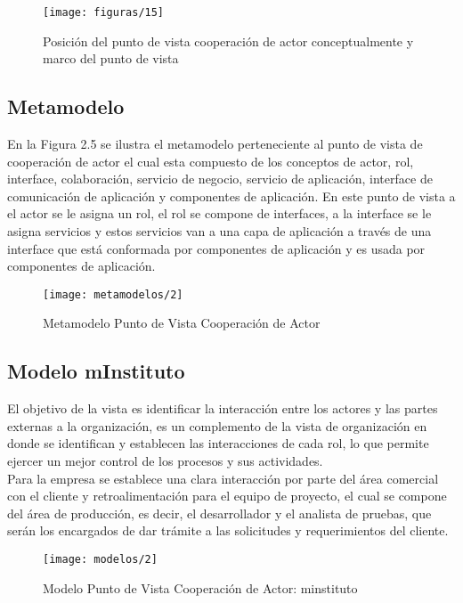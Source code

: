   \begin{figure}[!h]
   	\centering
   	\texttt{[image: figuras/15]}
   	\captionsetup{width=.95\textwidth}
   	\caption{Posición del punto de vista cooperación de actor conceptualmente y marco del punto de vista}
   	\label{figura15}
   \end{figure}
  
  \subsection{Metamodelo}
  En la Figura 2.5 se ilustra el metamodelo perteneciente al punto de vista de cooperación de actor el cual esta compuesto de los conceptos de actor, rol, interface, colaboración, servicio de negocio, servicio de aplicación, interface de comunicación de aplicación y componentes de aplicación. En este punto de vista a el actor se le asigna un rol, el rol se compone de interfaces, a la interface se le asigna servicios y estos servicios van a una capa de aplicación a través de una interface que está conformada por componentes de aplicación y es usada por componentes de aplicación.
  
  \begin{figure}[H]
  	\centering
  	\texttt{[image: metamodelos/2]}
  	\captionsetup{width=.95\textwidth}
  	\caption{Metamodelo Punto de Vista Cooperación de Actor}
  	\label{metamodelo2}
  \end{figure}
  
  \subsection{Modelo mInstituto}
  El objetivo de la vista es identificar la interacción entre los actores y las partes externas a la organización, es un complemento de la vista de organización en donde se identifican y establecen las interacciones de cada rol, lo que permite ejercer un mejor control de los procesos y sus actividades.\\
  
  Para la empresa se establece una clara interacción por parte del área comercial con el cliente y retroalimentación para el equipo de proyecto, el cual se compone del área de producción, es decir, el desarrollador y el analista de pruebas, que serán los encargados de dar trámite a las solicitudes y requerimientos del cliente.
  
  \begin{figure}[H]
  	\centering
  	\texttt{[image: modelos/2]}
  	\captionsetup{width=.95\textwidth}
  	\caption{Modelo Punto de Vista Cooperación de Actor: minstituto}
  	\label{modelo2}
  \end{figure}
 

